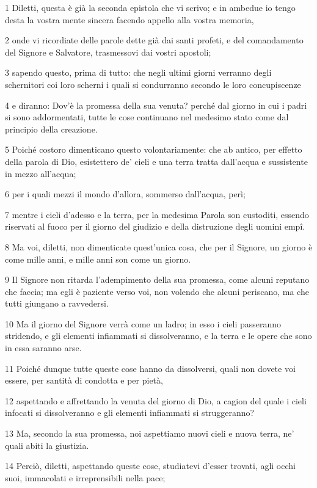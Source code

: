 \par 1 Diletti, questa è già la seconda epistola che vi scrivo; e in ambedue io tengo desta la vostra mente sincera facendo appello alla vostra memoria,
\par 2 onde vi ricordiate delle parole dette già dai santi profeti, e del comandamento del Signore e Salvatore, trasmessovi dai vostri apostoli;
\par 3 sapendo questo, prima di tutto: che negli ultimi giorni verranno degli schernitori coi loro scherni i quali si condurranno secondo le loro concupiscenze
\par 4 e diranno: Dov'è la promessa della sua venuta? perché dal giorno in cui i padri si sono addormentati, tutte le cose continuano nel medesimo stato come dal principio della creazione.
\par 5 Poiché costoro dimenticano questo volontariamente: che ab antico, per effetto della parola di Dio, esistettero de' cieli e una terra tratta dall'acqua e sussistente in mezzo all'acqua;
\par 6 per i quali mezzi il mondo d'allora, sommerso dall'acqua, perì;
\par 7 mentre i cieli d'adesso e la terra, per la medesima Parola son custoditi, essendo riservati al fuoco per il giorno del giudizio e della distruzione degli uomini empî.
\par 8 Ma voi, diletti, non dimenticate quest'unica cosa, che per il Signore, un giorno è come mille anni, e mille anni son come un giorno.
\par 9 Il Signore non ritarda l'adempimento della sua promessa, come alcuni reputano che faccia; ma egli è paziente verso voi, non volendo che alcuni periscano, ma che tutti giungano a ravvedersi.
\par 10 Ma il giorno del Signore verrà come un ladro; in esso i cieli passeranno stridendo, e gli elementi infiammati si dissolveranno, e la terra e le opere che sono in essa saranno arse.
\par 11 Poiché dunque tutte queste cose hanno da dissolversi, quali non dovete voi essere, per santità di condotta e per pietà,
\par 12 aspettando e affrettando la venuta del giorno di Dio, a cagion del quale i cieli infocati si dissolveranno e gli elementi infiammati si struggeranno?
\par 13 Ma, secondo la sua promessa, noi aspettiamo nuovi cieli e nuova terra, ne' quali abiti la giustizia.
\par 14 Perciò, diletti, aspettando queste cose, studiatevi d'esser trovati, agli occhi suoi, immacolati e irreprensibili nella pace;
